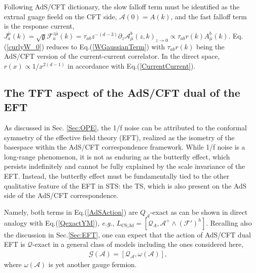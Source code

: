 \documentclass[final,5p,10pt,times,twocolumn,year]{elsarticle}
\begin{document}
Following AdS/CFT dictionary, \cite{AdSCFT_book} the slow falloff term must be identified as the extrnal guage fieeld on the CFT side, $\mathcal{A}(0) = A(k)$, and the fast falloff term  is the response current, $J_a^{\bar \mu}(k) = \sqrt{\mathfrak{g}} \mathcal{F}_a^{z\bar \mu}(k) = \tau_{ab} z^{-(d-3)} \partial_z \mathcal{A}^b_{\bar\mu}(z,k)_{z\to0} \propto \tau_{ab} r(k) A^b_{\bar\mu}(k) $. Eq.(\ref{curlyW_0}) reduces to  Eq.(\ref{WGaussianTerm}) with $\tau_{ab}r(k)$ being the AdS/CFT version of the current-current correlator. In the direct space, $r(x)\propto 1/x^{2 (d-1)}$ in accordance with Eq.(\ref{CurrentCurrent}). 

\subsection{The TFT aspect of the AdS/CFT dual of the EFT}

As discussed in Sec. \ref{Sec:OPE}, the 1/f noise can be attributed to the conformal symmetry of the effective field theory (EFT), realized as the isometry of the basespace within the AdS/CFT correspondence framework. While 1/f noise is a long-range phenomenon, it is not as enduring as the butterfly effect, which persists indefinitely and cannot be fully explained by the scale invariance of the EFT. Instead, the butterfly effect must be fundamentally tied to the other qualitative feature of the EFT in STS: the TS, which is also present on the AdS side of the AdS/CFT correspondence.

Namely, both terms in Eq.(\ref{AdSAction}) are $Q_\mathcal{A}$-exact as can be shown in direct analogy with Eq.(\ref{QexactYM}), \emph{e.g.}, ${L}_\text{CS,3d} = [\mathcal{Q}_{A}, {\mathcal A}^+ \wedge ({\mathcal F}')^{h}]$. Recalling also the discussion in Sec.\ref{Sec:EFT}, one can expect that the action of AdS/CFT dual EFT is $\mathcal Q$-exact in a general class of models including the ones considered here, 
\begin{eqnarray}
    \mathcal{G}(\mathcal{A}) = [\mathcal{Q}_{\mathcal A},\omega({\mathcal A})],\label{MoreGeneralAction}
\end{eqnarray}
where $\omega({\mathcal A})$ is yet another gauge fermion.
\end{document}
